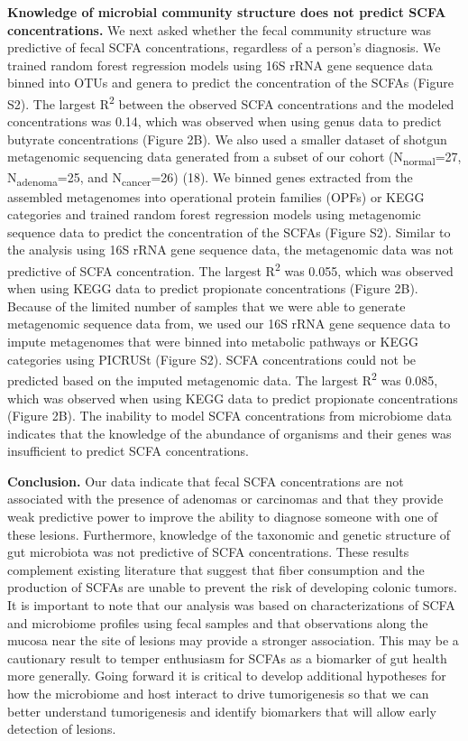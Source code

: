 \documentclass[11pt,]{article}
\begin{document}
\textbf{Knowledge of microbial community structure does not predict SCFA
concentrations.} We next asked whether the fecal community structure was
predictive of fecal SCFA concentrations, regardless of a person's
diagnosis. We trained random forest regression models using 16S rRNA
gene sequence data binned into OTUs and genera to predict the
concentration of the SCFAs (Figure S2). The largest R\textsuperscript{2}
between the observed SCFA concentrations and the modeled concentrations
was 0.14, which was observed when using genus data to predict butyrate
concentrations (Figure 2B). We also used a smaller dataset of shotgun
metagenomic sequencing data generated from a subset of our cohort
(N\textsubscript{normal}=27, N\textsubscript{adenoma}=25, and
N\textsubscript{cancer}=26) (18). We binned genes extracted from the
assembled metagenomes into operational protein families (OPFs) or KEGG
categories and trained random forest regression models using metagenomic
sequence data to predict the concentration of the SCFAs (Figure S2).
Similar to the analysis using 16S rRNA gene sequence data, the
metagenomic data was not predictive of SCFA concentration. The largest
R\textsuperscript{2} was 0.055, which was observed when using KEGG data
to predict propionate concentrations (Figure 2B). Because of the limited
number of samples that we were able to generate metagenomic sequence
data from, we used our 16S rRNA gene sequence data to impute metagenomes
that were binned into metabolic pathways or KEGG categories using
PICRUSt (Figure S2). SCFA concentrations could not be predicted based on
the imputed metagenomic data. The largest R\textsuperscript{2} was
0.085, which was observed when using KEGG data to predict propionate
concentrations (Figure 2B). The inability to model SCFA concentrations
from microbiome data indicates that the knowledge of the abundance of
organisms and their genes was insufficient to predict SCFA
concentrations.

\textbf{Conclusion.} Our data indicate that fecal SCFA concentrations
are not associated with the presence of adenomas or carcinomas and that
they provide weak predictive power to improve the ability to diagnose
someone with one of these lesions. Furthermore, knowledge of the
taxonomic and genetic structure of gut microbiota was not predictive of
SCFA concentrations. These results complement existing literature that
suggest that fiber consumption and the production of SCFAs are unable to
prevent the risk of developing colonic tumors. It is important to note
that our analysis was based on characterizations of SCFA and microbiome
profiles using fecal samples and that observations along the mucosa near
the site of lesions may provide a stronger association. This may be a
cautionary result to temper enthusiasm for SCFAs as a biomarker of gut
health more generally. Going forward it is critical to develop
additional hypotheses for how the microbiome and host interact to drive
tumorigenesis so that we can better understand tumorigenesis and
identify biomarkers that will allow early detection of lesions.
\end{document}
